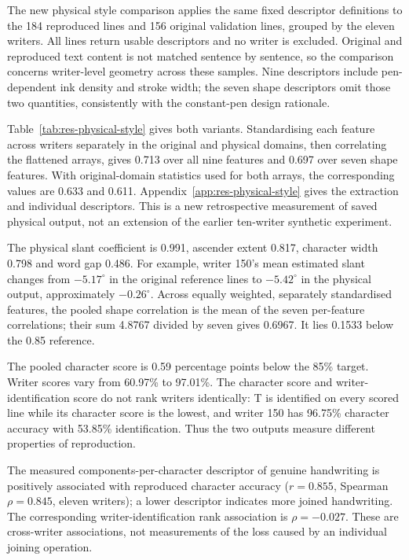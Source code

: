 The new physical style comparison applies the same fixed descriptor definitions to the 184 reproduced lines and 156 original validation lines, grouped by the eleven writers. All lines return usable descriptors and no writer is excluded. Original and reproduced text content is not matched sentence by sentence, so the comparison concerns writer-level geometry across these samples. Nine descriptors include pen-dependent ink density and stroke width; the seven shape descriptors omit those two quantities, consistently with the constant-pen design rationale.

Table~\ref{tab:res-physical-style} gives both variants. Standardising each feature across writers separately in the original and physical domains, then correlating the flattened arrays, gives 0.713 over all nine features and 0.697 over seven shape features. With original-domain statistics used for both arrays, the corresponding values are 0.633 and 0.611. Appendix~\ref{app:res-physical-style} gives the extraction and individual descriptors. This is a new retrospective measurement of saved physical output, not an extension of the earlier ten-writer synthetic experiment.


The physical slant coefficient is 0.991, ascender extent 0.817, character width 0.798 and word gap 0.486. For example, writer 150's mean estimated slant changes from $-5.17^\circ$ in the original reference lines to $-5.42^\circ$ in the physical output, approximately $-0.26^\circ$. Across equally weighted, separately standardised features, the pooled shape correlation is the mean of the seven per-feature correlations; their sum 4.8767 divided by seven gives 0.6967. It lies 0.1533 below the 0.85 reference.

The pooled character score is 0.59 percentage points below the 85\% target. Writer scores vary from 60.97\% to 97.01\%. The character score and writer-identification score do not rank writers identically: T is identified on every scored line while its character score is the lowest, and writer 150 has 96.75\% character accuracy with 53.85\% identification. Thus the two outputs measure different properties of reproduction.

The measured components-per-character descriptor of genuine handwriting is positively associated with reproduced character accuracy ($r=0.855$, Spearman $\rho=0.845$, eleven writers); a lower descriptor indicates more joined handwriting. The corresponding writer-identification rank association is $\rho=-0.027$. These are cross-writer associations, not measurements of the loss caused by an individual joining operation.

